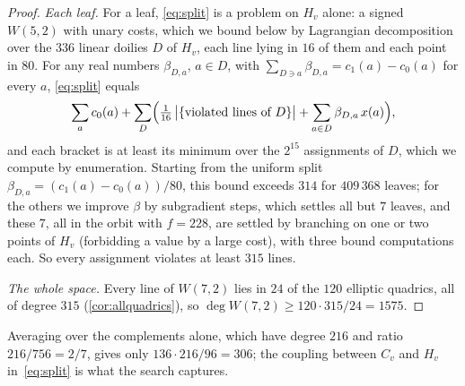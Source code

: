 \documentclass[11pt]{article}
\theoremstyle{definition}
\theoremstyle{remark}
\newcommand{\dg}{\operatorname{deg}}
\begin{document}
\begin{proof}
\emph{Each leaf.}
For a leaf, \eqref{eq:split} is a problem on $H_v$ alone: a signed $W(5,2)$ with unary costs, which we bound below by Lagrangian decomposition over the $336$ linear doilies $D$ of $H_v$, each line lying in $16$ of them and each point in $80$.
For any real numbers $\beta_{D,a}$, $a\in D$, with $\sum_{D\ni a}\beta_{D,a}=c_1(a)-c_0(a)$ for every $a$, \eqref{eq:split} equals
\[\sum_a c_0(a)+\sum_D\Bigl(\tfrac1{16}\,\bigl|\{\text{violated lines of }D\}\bigr|+\sum_{a\in D}\beta_{D,a}\,x(a)\Bigr),\]
and each bracket is at least its minimum over the $2^{15}$ assignments of $D$, which we compute by enumeration.
Starting from the uniform split $\beta_{D,a}=(c_1(a)-c_0(a))/80$, this bound exceeds $314$ for $409\,368$ leaves; for the others we improve $\beta$ by subgradient steps, which settles all but $7$ leaves, and these $7$, all in the orbit with $f=228$, are settled by branching on one or two points of $H_v$ (forbidding a value by a large cost), with three bound computations each.
So every assignment violates at least $315$ lines.

\emph{The whole space.}
Every line of $W(7,2)$ lies in $24$ of the $120$ elliptic quadrics, all of degree $315$ (\cref{cor:allquadrics}), so $\dg W(7,2)\ge120\cdot315/24=1575$.
\end{proof}

Averaging over the complements alone, which have degree $216$ and ratio $216/756=2/7$, gives only $136\cdot216/96=306$; the coupling between $C_v$ and $H_v$ in~\eqref{eq:split} is what the search captures.
\end{document}

